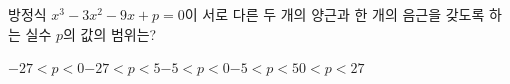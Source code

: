 방정식 $x^3-3x^2-9x+p=0$이 서로 다른 두 개의 양근과 한 개의 음근을 갖도록 하는 실수 $p$의 값의 범위는?
\begin{choicesii}{$-27<p<0$}{$-27<p<5$}{$-5<p<0$}{$-5<p<5$}{$0<p<27$}\end{choicesii}
